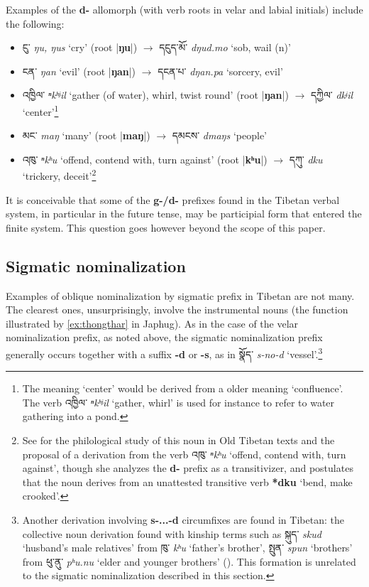 \documentclass[oneside,a4paper,11pt]{article}
\newcommand{\ipa}[1]{\textbf{{\phon\mbox{#1}}}} %
\newcommand{\tibet}[3]{{\tibetain#1} \textit{\phon#2} `#3'}
\newcommand{\dhat}[1]{|\ipa{#1}|}
\begin{document}
Examples of the \ipa{d-} allomorph (with verb roots in velar and labial initials) include the following:

\begin{itemize}
\item \tibet{ངུ་}{ŋu, ŋus}{cry} (root \dhat{ŋu}) $\rightarrow$	\tibet{དངུད་མོ་}{dŋud.mo}{sob, wail (n)} 	
\item \tibet{ངན་}{ŋan}{evil} (root \dhat{ŋan}) $\rightarrow$	\tibet{དངན་པ་}{dŋan.pa}{sorcery, evil} 	
\item \tibet{འཁྱིལ་}{ⁿkʰʲil}{gather (of water), whirl, twist round} (root \dhat{ŋan}) $\rightarrow$	\tibet{དཀྱིལ་}{dkʲil}{center}\footnote{The meaning `center' would be derived from a older meaning `confluence'. The verb  \tibet{འཁྱིལ་}{ⁿkʰʲil}{gather, whirl} is used for instance to refer to water gathering into a pond. }
\item \tibet{མང་}{maŋ}{many} (root \dhat{maŋ}) $\rightarrow$	\tibet{དམངས་}{dmaŋs}{people}
\item \tibet{འཁུ་}{ⁿkʰu}{offend, contend with, turn against} (root \dhat{kʰu}) $\rightarrow$	\tibet{དཀུ་}{dku}{trickery, deceit}\footnote{See \citet[150-1]{bialek16dku} for the philological study of this noun in Old Tibetan texts and the proposal of a derivation from the verb \tibet{འཁུ་}{ⁿkʰu}{offend, contend with, turn against}, though she analyzes the \ipa{d-} prefix as a transitivizer, and postulates that the noun derives from an unattested transitive verb \ipa{*dku} `bend, make crooked'. }


\end{itemize}


It is conceivable that some of the \ipa{g-/d-} prefixes found in the Tibetan verbal system, in particular in the future tense, may be participial form that entered the finite system. This question goes however beyond the scope of this paper.

\subsection{Sigmatic nominalization}
Examples of oblique nominalization by sigmatic prefix in Tibetan are not many. The clearest ones, unsurprisingly, involve the instrumental nouns (the function illustrated by \ref{ex:thongthar} in Japhug). As in the case of the velar nominalization prefix, as noted above, the sigmatic nominalization prefix generally occurs together with a suffix \ipa{-d} or \ipa{-s}, as in \tibet{སྣོད་}{s-no-d}{vessel}.\footnote{Another derivation involving \ipa{s-...-d}   circumfixes are found in Tibetan: the collective noun derivation found with kinship terms such as \tibet{སྐུད་}{skud}{husband's male relatives} from  \tibet{ཁུ་}{kʰu}{father's brother}, \tibet{སྤུན་}{spun}{brothers} from  \tibet{ཕུ་ནུ་}{pʰu.nu}{elder and younger brothers} (\citealt{nagano94khu}). This formation is unrelated to the sigmatic nominalization described in this section.}
\end{document}
